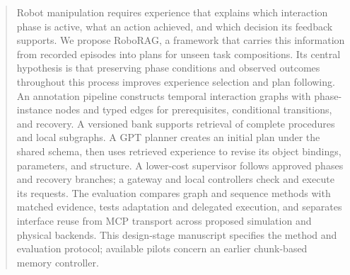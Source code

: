 \begin{abstract}
Robot manipulation requires experience that explains which interaction phase is active, what an action achieved, and which decision its feedback supports. We propose RoboRAG, a framework that carries this information from recorded episodes into plans for unseen task compositions. Its central hypothesis is that preserving phase conditions and observed outcomes throughout this process improves experience selection and plan following. An annotation pipeline constructs temporal interaction graphs with phase-instance nodes and typed edges for prerequisites, conditional transitions, and recovery. A versioned bank supports retrieval of complete procedures and local subgraphs. A GPT planner creates an initial plan under the shared schema, then uses retrieved experience to revise its object bindings, parameters, and structure. A lower-cost supervisor follows approved phases and recovery branches; a gateway and local controllers check and execute its requests. The evaluation compares graph and sequence methods with matched evidence, tests adaptation and delegated execution, and separates interface reuse from MCP transport across proposed simulation and physical backends. This design-stage manuscript specifies the method and evaluation protocol; available pilots concern an earlier chunk-based memory controller.
\end{abstract}

